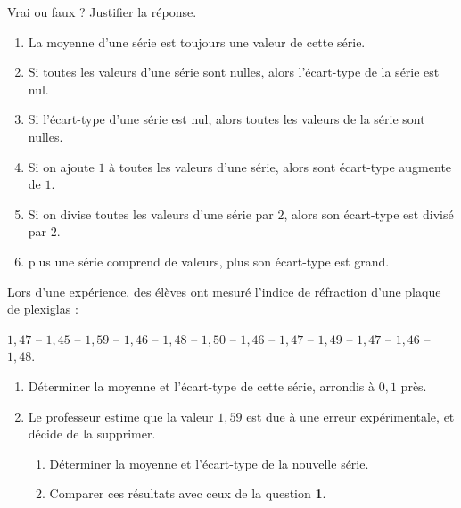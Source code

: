 \exo

Vrai ou faux ? Justifier la réponse.
\begin{enumerate}
\item La moyenne d'une série est toujours une valeur de cette série.
\item Si toutes les valeurs d'une série sont nulles, alors l'écart-type de la série est nul.
\item Si l'écart-type d'une série est nul, alors toutes les valeurs de la série sont nulles.
\item Si on ajoute $1$ à toutes les valeurs d'une série, alors sont écart-type augmente de $1$.
\item Si on divise toutes les valeurs d'une série par $2$, alors son écart-type est divisé par $2$.
\item plus une série comprend de valeurs, plus son écart-type est grand.
\end{enumerate}

\exo

Lors d'une expérience, des élèves ont mesuré l'indice de réfraction d'une plaque de plexiglas :
\begin{center}
$1,47$ -- $1,45$ -- $1,59$ -- $1,46$ -- $1,48$ -- $1,50$ -- $1,46$ -- $1,47$ -- $1,49$ -- $1,47$ -- $1,46$ -- $1,48$.
\end{center}
\begin{enumerate}
\item Déterminer la moyenne et l'écart-type de cette série, arrondis à $0,1$ près.
\item Le professeur estime que la valeur $1,59$ est due à une erreur expérimentale, et décide de la supprimer.
\begin{enumerate}
\item Déterminer la moyenne et l'écart-type de la nouvelle série.
\item Comparer ces résultats avec ceux de la question \textbf{1}.
\end{enumerate}
\end{enumerate}

\exo

